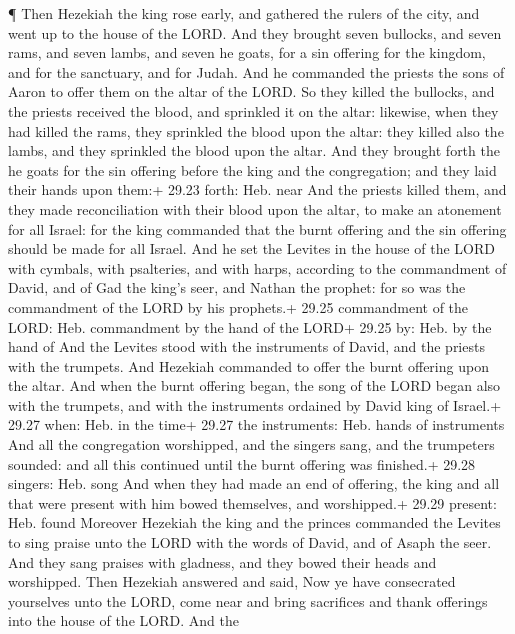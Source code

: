  ¶ Then Hezekiah the king rose early, and gathered the
rulers of the city, and went up to the house of the LORD. 
And they brought seven bullocks, and seven rams, and seven lambs, and
seven he goats, for a sin offering for the kingdom, and for the
sanctuary, and for Judah. And he commanded the priests the sons of Aaron
to offer them on the altar of the LORD.  So they killed the
bullocks, and the priests received the blood, and sprinkled it on the
altar: likewise, when they had killed the rams, they sprinkled the blood
upon the altar: they killed also the lambs, and they sprinkled the blood
upon the altar.  And they brought forth the he goats for
the sin offering before the king and the congregation; and they laid
their hands upon them:+ 29.23 forth: Heb. near  And the
priests killed them, and they made reconciliation with their blood upon
the altar, to make an atonement for all Israel: for the king commanded
that the burnt offering and the sin offering should be made for all
Israel.  And he set the Levites in the house of the LORD
with cymbals, with psalteries, and with harps, according to the
commandment of David, and of Gad the king's seer, and Nathan the
prophet: for so was the commandment of the LORD by his prophets.+ 29.25
commandment of the LORD: Heb. commandment by the hand of the LORD+ 29.25
by: Heb. by the hand of  And the Levites stood with the
instruments of David, and the priests with the trumpets. 
And Hezekiah commanded to offer the burnt offering upon the altar. And
when the burnt offering began, the song of the LORD began also with the
trumpets, and with the instruments ordained by David king of Israel.+
29.27 when: Heb. in the time+ 29.27 the instruments: Heb. hands of
instruments  And all the congregation worshipped, and the
singers sang, and the trumpeters sounded: and all this continued until
the burnt offering was finished.+ 29.28 singers: Heb. song 
And when they had made an end of offering, the king and all that were
present with him bowed themselves, and worshipped.+ 29.29 present: Heb.
found  Moreover Hezekiah the king and the princes commanded
the Levites to sing praise unto the LORD with the words of David, and of
Asaph the seer. And they sang praises with gladness, and they bowed
their heads and worshipped.  Then Hezekiah answered and
said, Now ye have consecrated yourselves unto the LORD, come near and
bring sacrifices and thank offerings into the house of the LORD. And the
